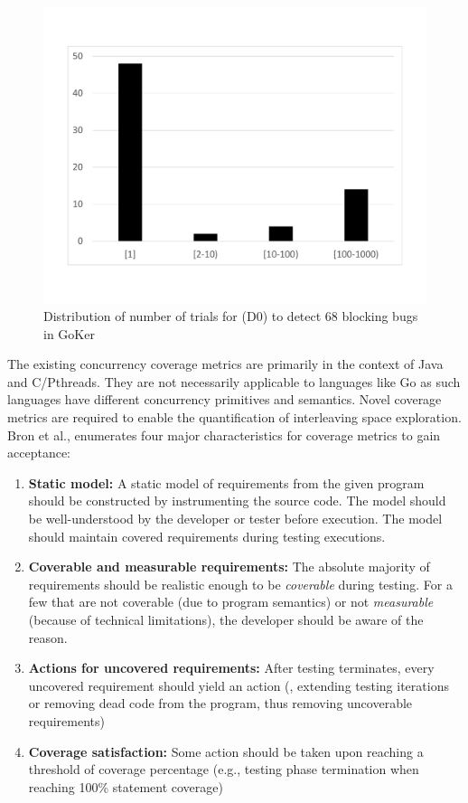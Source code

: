 \begin{figure}[]
\centering
\includegraphics[width=0.8\linewidth]{figs/coverage_motivation.pdf}
\caption{Distribution of number of trials for \goat (D0) to detect 68 blocking bugs in GoKer~\cite{yuan-gobench-cgo21}}
\label{fig:rare_bugs}
\end{figure}


The existing concurrency coverage metrics are primarily in the context of Java and C/Pthreads.
%
They are not necessarily applicable to languages like Go as such languages have different concurrency primitives and semantics.
%
Novel coverage metrics are required to enable the quantification of interleaving space exploration.
%
Bron et al.,\cite{bron-appSyncCov-ppopp05} enumerates four major characteristics for coverage metrics to gain acceptance:
\begin{enumerate}
  \item \textbf{Static model:} A static model of requirements from the given program should be constructed by instrumenting the source code. The model should be well-understood by the developer or tester before execution. The model should maintain covered requirements during testing executions.
  \item \textbf{Coverable and measurable requirements:} The absolute majority of requirements should be realistic enough to be \textit{coverable} during testing. For a few that are not coverable (due to program semantics) or not \textit{measurable} (because of technical limitations), the developer should be aware of the reason.
  \item \textbf{Actions for uncovered requirements:} After testing terminates, every uncovered requirement should yield an action (\eg, extending testing iterations or removing dead code from the program, thus removing uncoverable requirements)
  \item \textbf{Coverage satisfaction:} Some action should be taken upon reaching a threshold of coverage percentage (e.g., testing phase termination when reaching 100\% statement coverage)
\end{enumerate}

